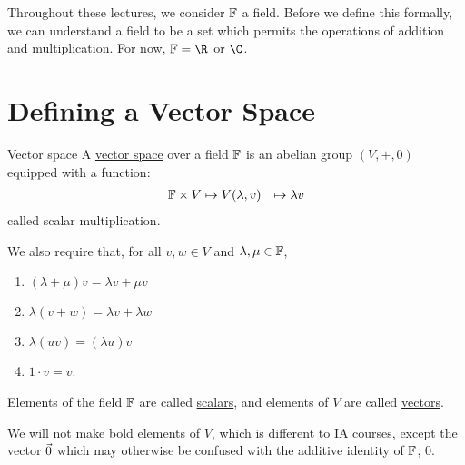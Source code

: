 \documentclass[../Main.tex]{subfiles}
\begin{document}
Throughout these lectures, we consider $\mathbb{F}$ a field. Before we define this formally, we can understand a field to be a set which permits the operations of addition and multiplication. For now, $\F = \R$ or $\C$.
\section{Defining a Vector Space}
\begin{definition}{Vector space}
    A \underline{vector space} over a field $\mathbb{F}$ is an abelian group $(V, +, 0)$ equipped with a function:
    \begin{align*}
        \mathbb{F} \times V &\mapsto V
        (\lambda, v) &\mapsto \lambda v
    \end{align*}
    called scalar multiplication.

    We also require that, for all $v, w \in V$ and $\lambda, \mu \in \mathbb{F}$,
    \begin{enumerate}
        \item $(\lambda + \mu)v = \lambda v + \mu v$
        \item $\lambda (v + w) = \lambda v + \lambda w$
        \item $\lambda (u v) = (\lambda u)v$
        \item $1 \cdot v = v$.
    \end{enumerate}
    Elements of the field $\mathbb{F}$ are called \underline{scalars}, and elements of $V$ are called \underline{vectors}.
\end{definition}
We will not make bold elements of $V$, which is different to IA courses, except the vector $\vec{0}$ which may otherwise be confused with the additive identity of $\mathbb{F}$, $0$.
\end{document}
